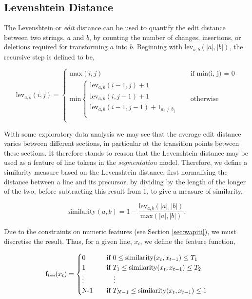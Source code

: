\subsection{Levenshtein Distance}

The Levenshtein or \emph{edit} distance can be used to quantify the edit distance between two strings, $a$ and $b$, by counting the number of changes, insertions, or deletions required for transforming $a$ into $b$. Beginning with $\text{lev}_{a, b}(|a|, |b|)$, the recursive step is defined to be,

\begin{equation}
  \text{lev}_{a, b}(i, j) = 
  \begin{cases} 
  	\text{max}(i, j) &\quad\text{if min(i, j) = 0} \\
	\text{min}
		\begin{cases}
			\text{lev}_{a, b}(i - 1, j) + 1 \\
			\text{lev}_{a, b}(i, j - 1) + 1 \\
			\text{lev}_{a, b}(i - 1, j - 1) + 1_{a_i \neq b_j} \\
		\end{cases} &\quad\text{otherwise} \\
  \end{cases}
\label{eq:levenshtein}
\end{equation}

With some exploratory data analysis we may see that the average edit distance varies between different sections, in particular at the transition points between these sections. It therefore stands to reason that the Levenshtein distance may be used as a feature of line tokens in the \emph{segmentation} model. Therefore, we define a similarity measure based on the Levenshtein distance, first normalising the distance between a line and its precursor, by dividing by the length of the longer of the two, before subtracting this result from 1, to give a measure of similarity,

\begin{equation}
\text{similarity}(a, b) = 1 - \frac{\text{lev}_{a, b}(|a|, |b|)}{\text{max}(|a|, |b|)}.
\label{eq:levenshteinsimilarity}
\end{equation}

Due to the constraints on numeric features (see Section \ref{sec:wapiti}), we must discretise the result. Thus, for a given line, $x_t$, we define the feature function, 

\begin{equation}
  \text{f}_{lev}(x_t) =
  \begin{cases}
  	0 & \quad \text{if } 0 \leq \text{similarity}(x_t, x_{t-1}) \leq T_1 \\
	1 & \quad \text{if } T_1 \leq \text{similarity}(x_t, x_{t-1}) \leq T_2\\
	\vdots & \qquad \vdots \\
	$N-1$ & \quad \text{if } T_{N-1} \leq \text{similarity}(x_t, x_{t-1}) \leq 1 \\
  \end{cases}
\label{eq:levenshteinfunction}
\end{equation}

